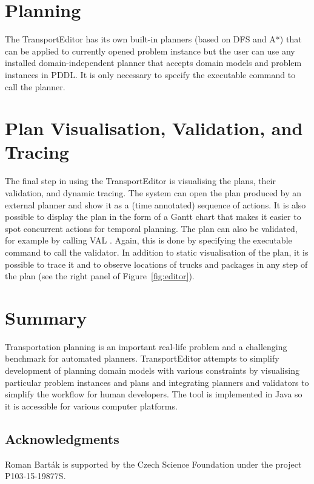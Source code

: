 \documentclass[letterpaper]{article}
\begin{document}
\section{Planning}
The TransportEditor has its own built-in planners (based on DFS and A*) that can be applied to currently opened problem instance but the user can use any installed domain-independent planner that accepts domain models and problem instances in PDDL. It is only necessary to specify the executable command to call the planner.


\section{Plan Visualisation, Validation, and Tracing}
The final step in using the TransportEditor is visualising the plans, their validation, and dynamic tracing. The system can open the plan produced by an external planner and show it as a (time annotated) sequence of actions. It is also possible to display the plan in the form of a Gantt chart that makes it easier to spot concurrent actions for temporal planning. The plan can also be validated, for example by calling VAL \cite{val}. Again, this is done by specifying the executable command to call the validator. In addition to static visualisation of the plan, it is possible to trace it and to observe locations of trucks and packages in any step of the plan (see the right panel of Figure~\ref{fig:editor}).


\section{Summary}
Transportation planning is an important real-life problem and a challenging benchmark for automated planners. TransportEditor attempts to simplify development of planning domain models with various constraints by visualising particular problem instances and plans and integrating planners and validators to simplify the workflow for human developers. The tool is implemented in Java so it is accessible for various computer platforms.


\subsection*{Acknowledgments}
Roman Bart\'{a}k is supported by the Czech Science Foundation under the project P103-15-19877S.
\end{document}
